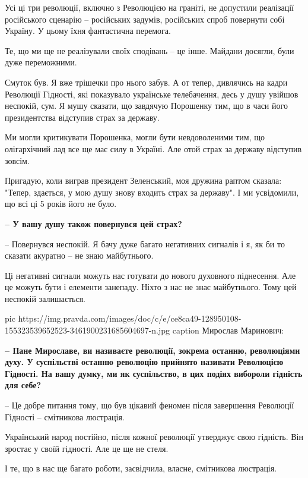 Усі ці три революції, включно з Революцією на граніті, не допустили реалізації
російського сценарію – російських задумів, російських спроб повернути собі
Україну. У цьому їхня фантастична перемога. 

Те, що ми ще не реалізували своїх сподівань – це інше. Майдани досягли, були
дуже переможними.

Смуток був. Я вже трішечки про нього забув. А от тепер, дивлячись на кадри
Революції Гідності, які показувало українське телебачення, десь у душу увійшов
неспокій, сум. Я мушу сказати, що завдячую Порошенку тим, що в часи його
президентства відступив страх за державу. 

Ми могли критикувати Порошенка, могли бути невдоволеними тим, що олігархічний лад все ще має силу в Україні. Але отой страх за державу відступив зовсім.

Пригадую, коли виграв президент Зеленський, моя дружина раптом сказала: "Тепер, здається, у мою душу знову входить страх за державу". І ми усвідомили, що всі ці 5 років його не було.

{\bfseries – У вашу душу також повернувся цей страх?  }

– Повернувся неспокій. Я бачу дуже багато негативних сигналів і я, як би то сказати акуратно – не знаю майбутнього. 

Ці негативні сигнали можуть нас готувати до нового духовного піднесення. Але це
можуть бути і елементи занепаду. Ніхто з нас не знає майбутнього. Тому цей
неспокій залишається.

\ifcmt
pic https://img.pravda.com/images/doc/c/e/ce8ca49-128950108-155323539652523-3461900231685604697-n.jpg
caption Мирослав Маринович: 
\fi

\textbf{– Пане Мирославе, ви називаєте революції, зокрема останню, революціями духу. У
суспільстві останню революцію прийнято називати Революцією Гідності. На вашу
думку, ми як суспільство, в цих подіях вибороли гідність для себе?}

– Це добре питання тому, що був цікавий феномен після завершення Революції Гідності – смітникова люстрація.

Український народ постійно, після кожної революції утверджує свою гідність. Він
зростає у своїй гідності. Але це ще не стеля. 

І те, що в нас ще багато роботи, засвідчила, власне, смітникова люстрація. 

